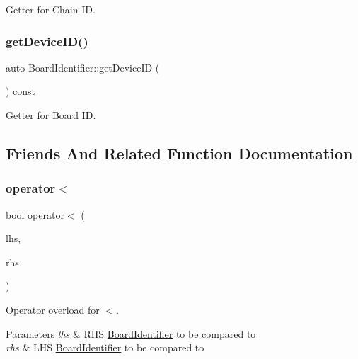 Getter for Chain ID. 

\mbox{\label{class_board_identifier_a8f3d818c08107a42fe9305607be38a3b}} 
\subsubsection{\texorpdfstring{get\+Device\+I\+D()}{getDeviceID()}}
{\footnotesize\ttfamily auto Board\+Identifier\+::get\+Device\+ID (\begin{DoxyParamCaption}{ }\end{DoxyParamCaption}) const\hspace{0.3cm}{\ttfamily [inline]}}



Getter for Board ID. 



\subsection{Friends And Related Function Documentation}
\mbox{\label{class_board_identifier_a952ba26774a854af0abe8f188ddda22b}} 
\subsubsection{\texorpdfstring{operator$<$}{operator<}}
{\footnotesize\ttfamily bool operator$<$ (\begin{DoxyParamCaption}\item[{const \hyperlink{class_board_identifier}{Board\+Identifier} \&}]{lhs,  }\item[{const \hyperlink{class_board_identifier}{Board\+Identifier} \&}]{rhs }\end{DoxyParamCaption})\hspace{0.3cm}{\ttfamily [friend]}}



Operator overload for $<$. 


\begin{DoxyParams}{Parameters}
{\em lhs} & R\+HS \hyperlink{class_board_identifier}{Board\+Identifier} to be compared to \\
\hline
{\em rhs} & L\+HS \hyperlink{class_board_identifier}{Board\+Identifier} to be compared to \\
\hline
\end{DoxyParams}
\mbox{\label{class_board_identifier_a7c82c259188e9ed8c552911db5c4f454}} 
